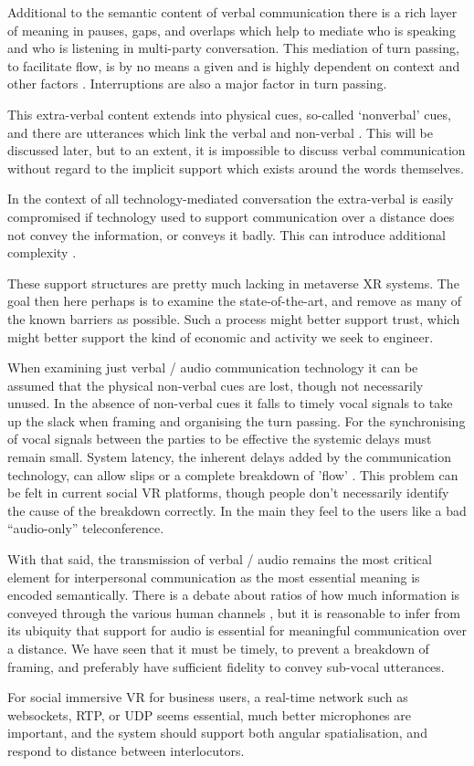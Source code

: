 Additional to the semantic content of verbal communication there is a rich layer of meaning in pauses, gaps, and overlaps \cite{Heldner2010} which help to mediate who is speaking and who is listening in multi-party conversation. This mediation of turn passing, to facilitate flow, is by no means a given and is highly dependent on context and other factors \cite{Kleinke1986}. Interruptions are also a major factor in turn passing.\par
This extra-verbal content \cite{Ting-Toomey2012} extends into physical cues, so-called `nonverbal' cues, and there are utterances which link the verbal and non-verbal \cite{Otsuka2005}. This will be discussed later, but to an extent, it is impossible to discuss verbal communication without regard to the implicit support which exists around the words themselves.\par
In the context of all technology-mediated conversation the extra-verbal is easily compromised if technology used to support communication over a distance does not convey the information, or conveys it badly. This can introduce additional complexity \cite{Otsuka2005}.\par
These support structures are pretty much lacking in metaverse XR systems. The goal then here perhaps is to examine the state-of-the-art, and remove as many of the known barriers as possible. Such a process might better support trust, which might better support the kind of economic and activity we seek to engineer.\par
When examining just verbal / audio communication technology it can be assumed that the physical non-verbal cues are lost, though not necessarily unused. In the absence of non-verbal cues it falls to timely vocal signals to take up the slack when framing and organising the turn passing. For the synchronising of vocal signals between the parties to be effective the systemic delays must remain small. System latency, the inherent delays added by the communication technology, can allow slips or a complete breakdown of 'flow' \cite{katagiri2007aiduti}. This problem can be felt in current social VR platforms, though people don't necessarily identify the cause of the breakdown correctly. In the main they feel to the users like a bad ``audio-only'' teleconference.\par
With that said, the transmission of verbal / audio remains the most critical element for interpersonal communication as the most essential meaning is encoded semantically. There is a debate about ratios of how much information is conveyed through the various human channels \cite{Loomis2012}, but it is reasonable to infer from its ubiquity that support for audio is essential for meaningful communication over a distance. We have seen that it must be timely, to prevent a breakdown of framing, and preferably have sufficient fidelity to convey sub-vocal utterances. \par
For social immersive VR for business users, a real-time network such as websockets, RTP, or UDP seems essential, much better microphones are important, and the system should support both angular spatialisation, and respond to distance between interlocutors.
